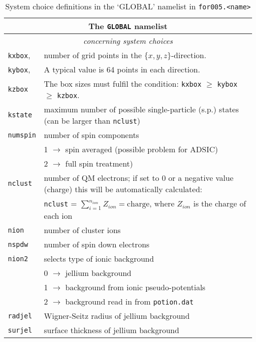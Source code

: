 \documentclass[11pt,a4paper]{article}
\begin{document}
		\begin{table}[h]
			\caption{System choice definitions in the `GLOBAL' namelist in \texttt{for005.<name>}}\label{tab:input-params-sys-choice}
			\begin{tabular}{|p{3.5cm}|p{11.2cm}|}
				\hline
				\multicolumn{2}{|c|}{The \texttt{GLOBAL} namelist}\\
				\hline
				\multicolumn{2}{|c|}{\textit{\color{activeColor}concerning system choices}}\\
				\hline
				\texttt{kxbox}, & number of grid points in the $\{x,y,z\}$-direction.\\
				\texttt{kybox}, & A typical value is 64 points in each direction.\\
				\texttt{kzbox} & The box sizes must fulfil the condition: \texttt{kxbox} $\geq$ \texttt{kybox} $\geq$ \texttt{kzbox}.\\
				\hline
				\texttt{kstate}& maximum number of possible single-particle (s.p.) states (can be larger than \texttt{nclust})\\
			  	\hline
				\texttt{numspin}& number of spin components\\
				& 1 $\rightarrow$ spin averaged (possible problem for ADSIC)\\
				& 2 $\rightarrow$ full spin treatment)\\
				\hline
				\texttt{nclust}& number of QM electrons; if set to 0 or a negative value (charge) this will be automatically calculated: \\
				& \texttt{nclust} = $\sum_{i=1}^{n_{ion}} Z_{ion} = \mathrm{charge}$, where $Z_{ion}$ is the charge of each ion\\
				\hline
				\texttt{nion}& number of cluster ions\\
				\hline
				\texttt{nspdw}& number of spin down electrons \\
				\hline
				\texttt{nion2}& selects type of ionic background \\
				                       &  0 $\rightarrow$ jellium background \\
				                       &  1 $\rightarrow$ background from ionic pseudo-potentials\\
				                       &  2 $\rightarrow$ background read in from \texttt{potion.dat}\\
				\hline
				\texttt{radjel           }& Wigner-Seitz radius of jellium background\\
				\hline
				\texttt{surjel         }& surface thickness of jellium background\\

\end{tabular}
\end{table}
\end{document}
